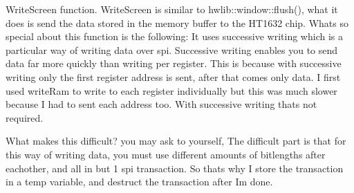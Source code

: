 Write\+Screen function. Write\+Screen is similar to hwlib\+::window\+::flush(), what it does is send the data stored in the memory buffer to the H\+T1632 chip. What\textquotesingle{}s so special about this function is the following\+: It uses \textquotesingle{}successive writing\textquotesingle{} which is a particular way of writing data over spi. Successive writing enables you to send data far more quickly than writing per register. This is because with successive writing only the first register address is sent, after that comes only data. I first used write\+Ram to write to each register individually but this was much slower because I had to sent each address too. With successive writing that\textquotesingle{}s not required. 

What makes this difficult? you may ask to yourself, The difficult part is that for this way of writing data, you must use different amounts of bitlengths after eachother, and all in but 1 spi transaction. So that\textquotesingle{}s why I store the transaction in a temp variable, and destruct the transaction after I\textquotesingle{}m done. 